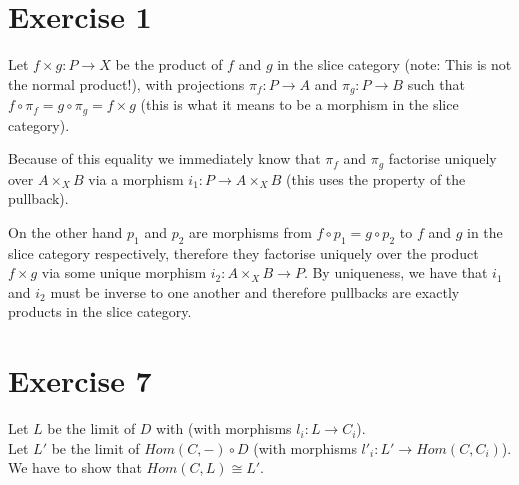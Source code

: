 \documentclass{scrartcl}
\begin{document}
    \section*{Exercise 1}
    
    Let $f × g : P → X$ be the product of $f$ and $g$ in the slice category (note: This is not the normal product!), with projections $π_f : P → A$ and $π_g : P → B$ such that $f \circ π_f = g \circ π_g = f × g$ (this is what it means to be a morphism in the slice category).
    
    Because of this equality we immediately know that $π_f$ and $π_g$ factorise uniquely over $A ×_{X} B$ via a morphism $i_1 : P → A ×_{X} B$ (this uses the property of the pullback).
    
    On the other hand $p_1$ and $p_2$ are morphisms from $f \circ p_1 = g \circ p_2$ to $f$ and $g$ in the slice category respectively, therefore they factorise uniquely over the product $f × g$ via some unique morphism $i_2: A ×_{X} B → P$. By uniqueness, we have that $i_1$ and $i_2$ must be inverse to one another and therefore pullbacks are exactly products in the slice category.
    
    \begin{figure}[H]\centering{}
    \end{figure}
    
    \section*{Exercise 7}
    
    Let $L$ be the limit of $D$ with (with morphisms $l_i : L → C_i$).\\
    Let $L'$ be the limit of $Hom(C, -) \circ D$ (with morphisms $l'_i : L' → Hom(C, C_i)$).\\

    We have to show that $Hom(C, L) \cong L'$.
    
\end{document}
